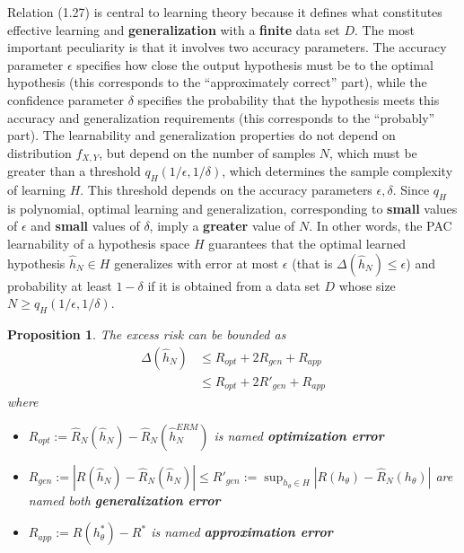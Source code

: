 \documentclass{report}
\newtheorem{proposition}{Proposition}[chapter]
\begin{document}
Relation (1.27) is central to learning theory because it defines what constitutes effective learning and \textbf{generalization} with a \textbf{finite} data set $D$. The most important peculiarity is that it involves two accuracy parameters. The accuracy parameter $\epsilon$ specifies how close the output hypothesis must be to the optimal hypothesis (this corresponds to the “approximately correct” part), while the confidence parameter $\delta$ specifies the probability that the hypothesis meets this accuracy and generalization requirements (this corresponds to the “probably” part). The learnability and generalization properties do not depend on distribution $f_{X,Y}$, but depend on the number of samples $N$, which must be greater than a threshold $q_H(1/\epsilon,1/\delta)$, which determines the sample complexity of learning $H$. This threshold depends on the accuracy parameters $\epsilon,\delta$. Since $q_H$ is polynomial, optimal learning and generalization, corresponding to \textbf{small} values of $\epsilon$ and \textbf{small} values of $\delta$, imply a \textbf{greater} value of $N$. In other words, the PAC learnability of a hypothesis space $H$ guarantees that the optimal learned hypothesis $\hat{h}_N \in H$ generalizes with error at most $\epsilon$ (that is $\Delta(\hat{h}_N) \leq \epsilon$) and probability at least $1-\delta$ if it is obtained from a data set $D$ whose size $N \geq q_H(1/\epsilon,1/\delta)$.

\begin{proposition}
The excess risk can be bounded as
\begin{equation}
\begin{split}
\Delta(\hat{h}_N) & \leq R_{opt} + 2R_{gen} + R_{app}\\
  &\leq R_{opt} + 2R'_{gen} + R_{app}
\end{split}
\end{equation}
where
\begin{itemize}
\item $R_{opt} := \hat{R}_N(\hat{h}_N)-\hat{R}_N(\hat{h}^{ERM}_N)$ is named \textbf{optimization error}
\item $R_{gen} := |R(\hat{h}_N)-\hat{R}_N(\hat{h}_N)| \leq R'_{gen} := \sup_{h_{\theta} \in H}|R(h_\theta)-\hat{R}_N(h_\theta)|$ are named both \textbf{generalization error}
\item $R_{app} := R(h^*_\theta)-R^*$ is named \textbf{approximation error}
\end{itemize}
\end{proposition}
\end{document}
